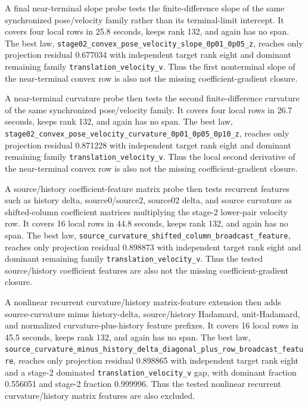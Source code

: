 \documentclass[11pt]{article}
\begin{document}
A final near-terminal slope probe tests the finite-difference slope of the
same synchronized pose/velocity family rather than its terminal-limit
intercept.  It covers four local rows in 25.8 seconds, keeps rank 132, and
again has no span.  The best law,
\nolinkurl{stage02_convex_pose_velocity_slope_0p01_0p05_z}, reaches only
projection residual 0.677034 with independent target rank eight and dominant
remaining family \nolinkurl{translation_velocity_v}.  Thus the first
nonterminal slope of the near-terminal convex row is also not the missing
coefficient-gradient closure.

A near-terminal curvature probe then tests the second finite-difference
curvature of the same synchronized pose/velocity family.  It covers four local
rows in 26.7 seconds, keeps rank 132, and again has no span.  The best law,
\nolinkurl{stage02_convex_pose_velocity_curvature_0p01_0p05_0p10_z}, reaches
only projection residual 0.871228 with independent target rank eight and
dominant remaining family \nolinkurl{translation_velocity_v}.  Thus the local
second derivative of the near-terminal convex row is also not the missing
coefficient-gradient closure.

A source/history coefficient-feature matrix probe then tests recurrent
features such as history delta, source0/source2, source02 delta, and source
curvature as shifted-column coefficient matrices multiplying the stage-2
lower-pair velocity row.  It covers 16 local rows in 44.8 seconds, keeps rank
132, and again has no span.  The best law,
\nolinkurl{source_curvature_shifted_column_broadcast_feature}, reaches only
projection residual 0.898873 with independent target rank eight and dominant
remaining family \nolinkurl{translation_velocity_v}.  Thus the tested
source/history coefficient features are also not the missing
coefficient-gradient closure.

A nonlinear recurrent curvature/history matrix-feature extension then adds
source-curvature minus history-delta, source/history Hadamard, unit-Hadamard,
and normalized curvature-plus-history feature prefixes.  It covers 16 local
rows in 45.5 seconds, keeps rank 132, and again has no span.  The best law,
\nolinkurl{source_curvature_minus_history_delta_diagonal_plus_row_broadcast_feature},
reaches only projection residual 0.898865 with independent target rank eight
and a stage-2 dominated \nolinkurl{translation_velocity_v} gap, with dominant
fraction 0.556051 and stage-2 fraction 0.999996.  Thus the tested nonlinear
recurrent curvature/history matrix features are also excluded.
\end{document}
